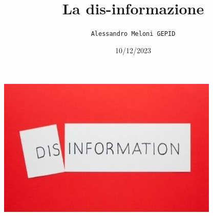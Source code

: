 \documentclass{article}
\title{\textbf{La dis-informazione}}
\author{\texttt{Alessandro Meloni GEPID}}
\date{10/12/2023}
\begin{document}
\maketitle
    \begin{center}
        \includegraphics[width = 0.6\linewidth]{Immagini/disinformation.jpeg}
    \end{center}
    
\end{document}
